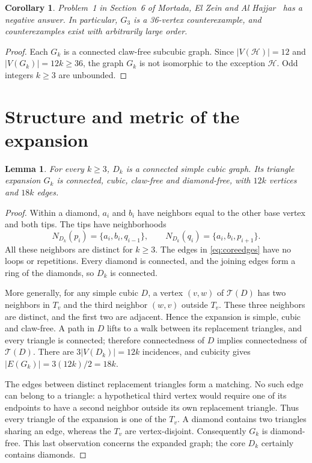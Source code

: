 \documentclass[11pt,a4paper]{article}
\newtheorem{lemma}[theorem]{Lemma}
\newtheorem{corollary}[theorem]{Corollary}
\theoremstyle{definition}
\theoremstyle{remark}
\newcommand{\V}{V}
\newcommand{\E}{E}
\newcommand{\NN}{N}
\newcommand{\Exp}{\mathcal{T}}
\begin{document}
\begin{corollary}\label{cor:problem}
Problem~1 in Section~6 of Mortada, El Zein and Al Hajjar~\cite{MEAH}
has a negative answer. In particular, \(G_3\) is a 36-vertex
counterexample, and counterexamples exist with arbitrarily large order.
\end{corollary}

\begin{proof}
Each \(G_k\) is a connected claw-free subcubic graph. Since
\(|\V(\mathcal H)|=12\) and \(|\V(G_k)|=12k\geq36\), the graph
\(G_k\) is not isomorphic to the exception \(\mathcal H\).
Odd integers \(k\geq3\) are unbounded.
\end{proof}

\section{Structure and metric of the expansion}

\begin{lemma}\label{lem:structure}
For every \(k\geq3\), \(D_k\) is a connected simple cubic graph.
Its triangle expansion \(G_k\) is connected, cubic, claw-free and
diamond-free, with \(12k\) vertices and \(18k\) edges.
\end{lemma}

\begin{proof}
Within a diamond, \(a_i\) and \(b_i\) have neighbors equal to the
other base vertex and both tips. The tips have neighborhoods
\begin{equation}\label{eq:tipneighbors}
 \NN_{D_k}(p_i)=\{a_i,b_i,q_{i-1}\},\qquad
 \NN_{D_k}(q_i)=\{a_i,b_i,p_{i+1}\}.
\end{equation}
All these neighbors are distinct for \(k\geq3\). The edges in
\eqref{eq:coreedges} have no loops or repetitions. Every diamond is
connected, and the joining edges form a ring of the diamonds, so
\(D_k\) is connected.

More generally, for any simple cubic \(D\), a vertex \((v,w)\) of
\(\Exp(D)\) has two neighbors in \(T_v\) and the third neighbor
\((w,v)\) outside \(T_v\). These three neighbors are distinct,
and the first two are adjacent. Hence the expansion is simple,
cubic and claw-free. A path in \(D\) lifts to a walk between its
replacement triangles, and every triangle is connected; therefore
connectedness of \(D\) implies connectedness of \(\Exp(D)\).
There are \(3|\V(D_k)|=12k\) incidences, and cubicity gives
\(|\E(G_k)|=3(12k)/2=18k\).

The edges between distinct replacement triangles form a matching.
No such edge can belong to a triangle: a hypothetical third vertex
would require one of its endpoints to have a second neighbor outside
its own replacement triangle. Thus every triangle of the expansion
is one of the \(T_v\). A diamond contains two triangles sharing an
edge, whereas the \(T_v\) are vertex-disjoint. Consequently \(G_k\)
is diamond-free. This last observation concerns the expanded graph;
the core \(D_k\) certainly contains diamonds.
\end{proof}
\end{document}

